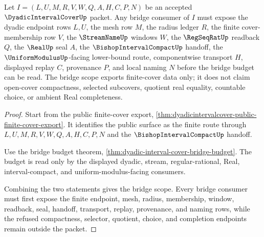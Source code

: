\begin{theorem}
\label{thm:dyadicintervalcover-finite-cover-bridge-scope}
Let $I=(L,U,M,R,V,W,Q,A,H,C,P,N)$ be an accepted $\DyadicIntervalCoverUp$ packet. Any bridge consumer of $I$ must expose the dyadic endpoint rows $L,U$, the mesh row $M$, the radius ledger $R$, the finite cover-membership row $V$, the $\StreamNameUp$ windows $W$, the $\RegSeqRatUp$ readback $Q$, the $\RealUp$ seal $A$, the $\BishopIntervalCompactUp$ handoff, the $\UniformModulusUp$-facing lower-bound route, componentwise transport $H$, displayed replay $C$, provenance $P$, and local naming $N$ before the bridge budget can be read. The bridge scope exports finite-cover data only; it does not claim open-cover compactness, selected subcovers, quotient real equality, countable choice, or ambient Real completeness.
\end{theorem}
\begin{proof}
Start from the public finite-cover export, \autoref{thm:dyadicintervalcover-public-finite-cover-export}. It identifies the public surface as the finite route through $L,U,M,R,V,W,Q,A,H,C,P,N$ and the $\BishopIntervalCompactUp$ handoff.

Use the bridge budget theorem, \autoref{thm:dyadic-interval-cover-bridge-budget}. The budget is read only by the displayed dyadic, stream, regular-rational, Real, interval-compact, and uniform-modulus-facing consumers.

Combining the two statements gives the bridge scope. Every bridge consumer must first expose the finite endpoint, mesh, radius, membership, window, readback, seal, handoff, transport, replay, provenance, and naming rows, while the refused compactness, selector, quotient, choice, and completion endpoints remain outside the packet.
\end{proof}

